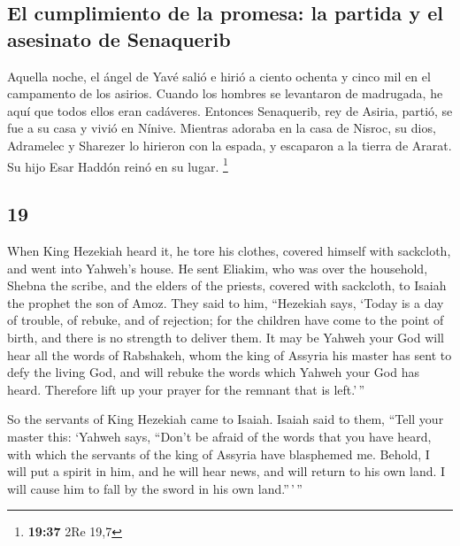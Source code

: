 \begin{paracol}{2}
\hypertarget{el-cumplimiento-de-la-promesa-la-partida-y-el-asesinato-de-senaquerib}{%
\subsection{El cumplimiento de la promesa: la partida y el asesinato de
Senaquerib}\label{el-cumplimiento-de-la-promesa-la-partida-y-el-asesinato-de-senaquerib}}

 Aquella noche, el ángel de Yavé salió e hirió a ciento
ochenta y cinco mil en el campamento de los asirios. Cuando los hombres
se levantaron de madrugada, he aquí que todos ellos eran cadáveres.
 Entonces Senaquerib, rey de Asiria, partió, se fue a su
casa y vivió en Nínive.  Mientras adoraba en la casa de
Nisroc, su dios, Adramelec y Sharezer lo hirieron con la espada, y
escaparon a la tierra de Ararat. Su hijo Esar Haddón reinó en su lugar.
\footnote{\textbf{19:37} 2Re 19,7}

\switchcolumn
\begin{otherlanguage}{english}

\hypertarget{section-37}{%
\section{19}\label{section-37}}

 When King Hezekiah heard it, he tore his clothes, covered
himself with sackcloth, and went into Yahweh's house.  He
sent Eliakim, who was over the household, Shebna the scribe, and the
elders of the priests, covered with sackcloth, to Isaiah the prophet the
son of Amoz.  They said to him, ``Hezekiah says, `Today is
a day of trouble, of rebuke, and of rejection; for the children have
come to the point of birth, and there is no strength to deliver them.
 It may be Yahweh your God will hear all the words of
Rabshakeh, whom the king of Assyria his master has sent to defy the
living God, and will rebuke the words which Yahweh your God has heard.
Therefore lift up your prayer for the remnant that is left.'\,''

 So the servants of King Hezekiah came to Isaiah.
 Isaiah said to them, ``Tell your master this: `Yahweh
says, ``Don't be afraid of the words that you have heard, with which the
servants of the king of Assyria have blasphemed me. 
Behold, I will put a spirit in him, and he will hear news, and will
return to his own land. I will cause him to fall by the sword in his own
land.''\,'\,''


\end{otherlanguage}
\end{paracol}
